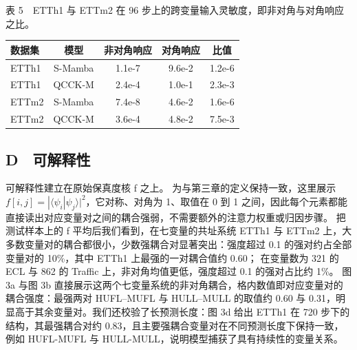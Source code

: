 \begin{center}

\begin{minipage}{\textwidth}

\footnotesize

表 5　ETTh1 与 ETTm2 在 96 步上的跨变量输入灵敏度，即非对角与对角响应之比。\\[2pt]

\centering

\setlength{\tabcolsep}{4pt}

\begin{tabular}{@{}lcccc@{}}

\hline

数据集 & 模型 & 非对角响应 & 对角响应 & 比值 \\ \hline

ETTh1 & S-Mamba & 1.1e-7 & 9.6e-2 & 1.2e-6 \\

ETTh1 & QCCK-M & 2.4e-4 & 1.0e-1 & 2.3e-3 \\

ETTm2 & S-Mamba & 7.4e-8 & 4.6e-2 & 1.6e-6 \\

ETTm2 & QCCK-M & 3.6e-4 & 4.8e-2 & 7.5e-3 \\

\hline

\end{tabular}

\end{minipage}

\end{center}

\subsection{D　可解释性}

可解释性建立在原始保真度核 f 之上。
为与第三章的定义保持一致，这里展示 $f[i,j]=|\langle\psi_i|\psi_j\rangle|^2$，它对称、对角为 1、取值在 0 到 1 之间，因此每个元素都能直接读出对应变量对之间的耦合强弱，不需要额外的注意力权重或归因步骤。
把测试样本上的 f 平均后我们看到，在七变量的共址系统 ETTh1 与 ETTm2 上，大多数变量对的耦合都很小，少数强耦合对显著突出：强度超过 0.1 的强对约占全部变量对的 10\%，其中 ETTh1 上最强的一对耦合值约 0.60；
在变量数为 321 的 ECL 与 862 的 Traffic 上，非对角均值更低，强度超过 0.1 的强对占比约 1\%。
图 3a 与图 3b 直接展示这两个七变量系统的非对角耦合，格内数值即对应变量对的耦合强度：最强两对 HUFL–MUFL 与 HULL–MULL 的取值约 0.60 与 0.31，明显高于其余变量对。我们还校验了长预测长度：图 3d 给出 ETTh1 在 720 步下的结构，其最强耦合对约 0.83，且主要强耦合变量对在不同预测长度下保持一致，例如 HUFL-MUFL 与 HULL-MULL，说明模型捕获了具有持续性的变量关系。

